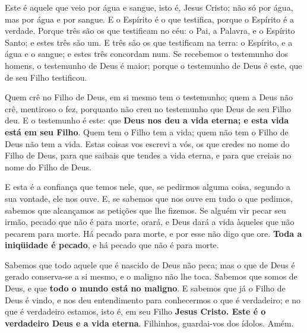 Este é aquele que veio por água e sangue, isto é, Jesus Cristo;
não só por água, mas por água e por sangue. E o Espírito é o que
testifica, porque o Espírito é a verdade. Porque três são os que
testificam no céu: o Pai, a Palavra, e o Espírito Santo; e estes
três são um. E três são os que testificam na terra: o Espírito,
e a água e o sangue; e estes três concordam num. Se recebemos o
testemunho dos homens, o testemunho de Deus é maior; porque o
testemunho de Deus é este, que de seu Filho testificou.

Quem crê no Filho de Deus, em si mesmo tem o testemunho; quem a
Deus não crê, mentiroso o fez, porquanto não creu no testemunho que
Deus de seu Filho deu. E o testemunho é este: que
\textbf{Deus nos deu a vida eterna; e esta vida está em seu Filho}.
Quem tem o Filho tem a vida; quem não tem o Filho de Deus não
tem a vida. Estas coisas vos escrevi a vós, os que credes no
nome do Filho de Deus, para que saibais que tendes a vida eterna, e
para que creiais no nome do Filho de Deus.

E esta é a confiança que temos nele, que, se pedirmos alguma
coisa, segundo a sua vontade, ele nos ouve. E, se sabemos que
nos ouve em tudo o que pedimos, sabemos que alcançamos as petições
que lhe fizemos. Se alguém vir pecar seu irmão, pecado que
não é para morte, orará, e Deus dará a vida àqueles que não pecarem
para morte. Há pecado para morte, e por esse não digo que ore.
\textbf{Toda a iniqüidade é pecado}, e há pecado que não é
para morte.

Sabemos que todo aquele que é nascido de Deus não peca; mas o que
de Deus é gerado conserva-se a si mesmo, e o maligno não lhe toca.
Sabemos que somos de Deus, e que \textbf{todo o mundo está no
maligno}. E sabemos que já o Filho de Deus é vindo, e nos deu
entendimento para conhecermos o que é verdadeiro; e no que é
verdadeiro estamos, isto é, em seu Filho \textbf{Jesus Cristo. Este é o verdadeiro Deus e a vida
eterna}. Filhinhos, guardai-vos dos ídolos. Amém.

